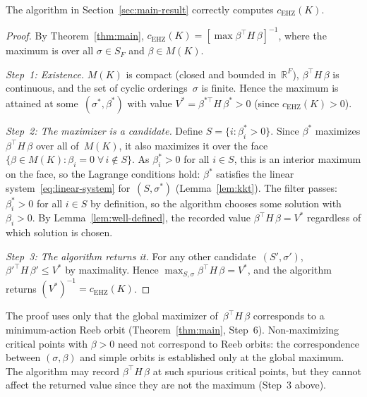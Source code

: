 \begin{theorem}\label{thm:algorithm-correct}
The algorithm in Section~\ref{sec:main-result} correctly computes
$c_{\mathrm{EHZ}}(K)$.
\end{theorem}

\begin{proof}
By Theorem~\ref{thm:main},
$c_{\mathrm{EHZ}}(K)
= [\max \beta^\top H\, \beta]^{-1}$,
where the maximum is over all $\sigma \in S_F$ and
$\beta \in M(K)$.

\emph{Step~1: Existence.}
$M(K)$ is compact (closed and bounded in~$\mathbb{R}^F$),
$\beta^\top H\, \beta$ is continuous,
and the set of cyclic orderings~$\sigma$
is finite. Hence the maximum is attained at
some~$(\sigma^*, \beta^*)$ with value
$V^* = \beta^{*\top} H\, \beta^* > 0$
(since $c_{\mathrm{EHZ}}(K) > 0$).

\emph{Step~2: The maximizer is a candidate.}
Define $S = \{i : \beta^*_i > 0\}$.
Since $\beta^*$ maximizes
$\beta^\top H\, \beta$
over all of~$M(K)$, it also
maximizes it over the face
$\{\beta \in M(K) : \beta_i = 0 \;\forall\, i \notin S\}$.
As $\beta^*_i > 0$ for all $i \in S$, this is an interior
maximum on the face, so the Lagrange conditions hold:
$\beta^*$ satisfies the linear
system~\eqref{eq:linear-system} for~$(S, \sigma^*)$
(Lemma~\ref{lem:kkt}).
The filter passes: $\beta^*_i > 0$ for all $i \in S$ by
definition, so the algorithm chooses some solution with
$\beta_i > 0$.
By Lemma~\ref{lem:well-defined}, the recorded value
$\beta^\top H\, \beta = V^*$ regardless of which
solution is chosen.

\emph{Step~3: The algorithm returns it.}
For any other candidate~$(S', \sigma')$,
$\beta'^\top H\, \beta' \leq V^*$
by maximality. Hence
$\max_{S,\sigma} \beta^\top H\, \beta = V^*$,
and the algorithm returns
$(V^*)^{-1} = c_{\mathrm{EHZ}}(K)$.
\end{proof}

\begin{remark}\label{rem:non-maximizer-warning}
The proof uses only that the global maximizer
of~$\beta^\top H\, \beta$
corresponds to a minimum-action Reeb orbit
(Theorem~\ref{thm:main}, Step~6).
Non-maximizing critical points with $\beta > 0$
need not correspond to Reeb orbits:
the correspondence between $(\sigma, \beta)$ and simple orbits
is established only at the global maximum.
The algorithm may record $\beta^\top H\, \beta$ at such
spurious critical points, but they cannot affect the
returned value since they are not the maximum
(Step~3 above).
\end{remark}

